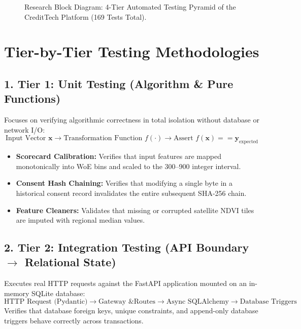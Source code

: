 \begin{figure}[H]
\caption{Research Block Diagram: 4-Tier Automated Testing Pyramid of the CreditTech Platform (169 Tests Total).}
\label{fig:testing_pyramid}
\end{figure}

\section{Tier-by-Tier Testing Methodologies}

\subsection{1. Tier 1: Unit Testing (Algorithm \& Pure Functions)}
Focuses on verifying algorithmic correctness in total isolation without database or network I/O:
$$\text{Input Vector } \mathbf{x} \longrightarrow \text{Transformation Function } f(\cdot) \longrightarrow \text{Assert } f(\mathbf{x}) == \mathbf{y}_{\text{expected}}$$
\begin{itemize}
  \item \textbf{Scorecard Calibration:} Verifies that input features are mapped monotonically into WoE bins and scaled to the 300--900 integer interval.
  \item \textbf{Consent Hash Chaining:} Verifies that modifying a single byte in a historical consent record invalidates the entire subsequent SHA-256 chain.
  \item \textbf{Feature Cleaners:} Validates that missing or corrupted satellite NDVI tiles are imputed with regional median values.
\end{itemize}

\subsection{2. Tier 2: Integration Testing (API Boundary $\rightarrow$ Relational State)}
Executes real HTTP requests against the FastAPI application mounted on an in-memory SQLite database:
$$\text{HTTP Request (Pydantic)} \longrightarrow \text{Gateway \& Routes} \longrightarrow \text{Async SQLAlchemy} \longrightarrow \text{Database Triggers}$$
Verifies that database foreign keys, unique constraints, and append-only database triggers behave correctly across transactions.

